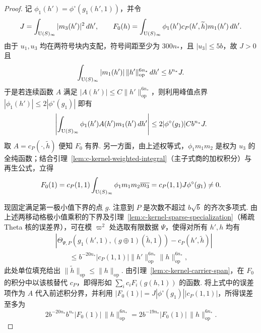 \begin{proof}
记 $\phi_1(h')=\phi^\circ(g_1(h',1))$，并令
\[
 J=\int_{\operatorname{U}(S)_\infty}|m_3(h')|^2\,dh',
 \qquad
 F_0(h)=\int_{\operatorname{U}(S)_\infty}\phi_1(h')c_P(h',\widetilde h)m_1(h')\,dh'.
\]
由于 $u_1,u_3$ 均在两符号块内支配，符号间距至少为 $300n_*$，且 $|u_3|\le 5b$，故 $J>0$ 且
\[
 \int_{\operatorname{U}(S)_\infty}|m_1(h')|\,\|h'\|_{\mathrm{op}}^{6n_*}\,dh'
 \le b^{n_*}J .
\]
于是若连续函数 $A$ 满足 $|A(h')|\le C\|h'\|_{\mathrm{op}}^{6n_*}$，则利用峰值点界 $|\phi_1(h')|\le2|\phi^\circ(g_1)|$ 即有
\[
 \left|\int_{\operatorname{U}(S)_\infty}\phi_1(h')A(h')m_1(h')\,dh'\right|
 \le2|\phi^\circ(g_1)|C b^{n_*}J .
\]
取 $A=c_P(\cdot,\widetilde h)$ 便知 $F_0$ 有界. 另一方面，由上述权等式，$\phi_1m_1m_2$ 是权为 $u_3$ 的全纯函数；结合引理~\ref{lem:c-kernel-weighted-integral}（主子式商的加权积分）与再生公式，立得
\[
 F_0(1)=c_P(1,1)\int_{\operatorname{U}(S)_\infty}\phi_1m_1m_2\overline{m_3}
       =c_P(1,1)J\phi^\circ(g_1)\ne0.
\]

现固定满足第一极小值下界的点 $g$. 注意到 $P$ 是次数不超过 $b\sqrt b$ 的齐次多项式. 由上述两移动格极小值乘积的下界及引理~\ref{lem:c-kernel-sparse-specialization}（稀疏 Theta 核的误差界），可在模 $\varpi^2$ 处选取有限数据 $\Psi$，使得对所有 $h',h$ 均有
\[
 \begin{aligned}
 &\left|\Theta_{\Psi,P}(g_1(h',1),(g\oplus1)(\widetilde h,1))
       -c_P(h',\widetilde h)\right|\\
 &\hspace{2em}\le b^{-20n_*}|c_P(1,1)|
          \|h'\|_{\mathrm{op}}^{6n_*}\|h\|_{\mathrm{op}}^{6n_*},
 \end{aligned}
\]
此处单位填充给出 $\|\widetilde h\|_{\mathrm{op}}\le \|h\|_{\mathrm{op}}$. 由引理~\ref{lem:c-kernel-carrier-span}，在 $F_0$ 的积分中以该核替代 $c_P$，即得形如 $\sum_i c_iF_i(g(h,1))$ 的函数. 将上式中的误差项作为 $A$ 代入前述积分界，并利用 $|F_0(1)|=J|\phi^\circ(g_1)||c_P(1,1)|$，所得误差至多为
\[
 2b^{-20n_*}b^{n_*}|F_0(1)|\,\|h\|_{\mathrm{op}}^{6n_*}
 =2b^{-19n_*}|F_0(1)|\,\|h\|_{\mathrm{op}}^{6n_*}.
\]
\end{proof}


